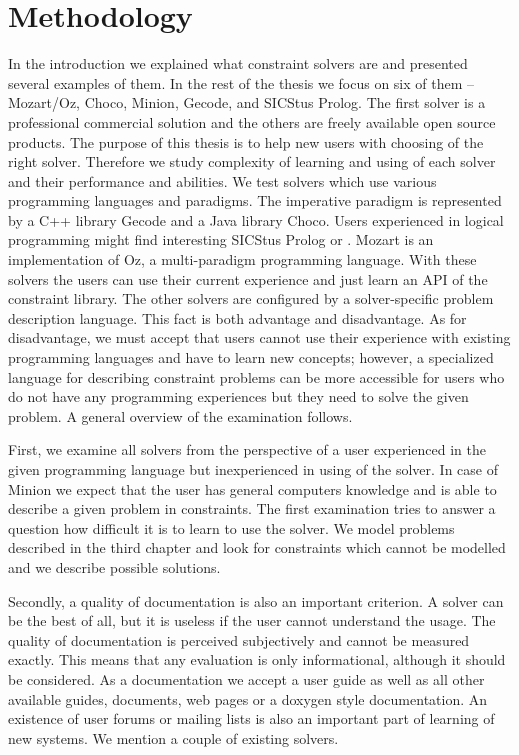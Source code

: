 \chapter{Methodology}
\thispagestyle{myheadings}

In the introduction we explained what constraint solvers are and presented several 
examples of them. In the rest of the thesis we focus on six of them -- Mozart/Oz, 
Choco, Minion, Gecode, \eclipse and SICStus Prolog. The first solver is a 
professional commercial solution and the others are freely available open source 
products. The purpose of this thesis is to help new users with choosing of the right solver. 
Therefore we study complexity of learning and using of each solver and their 
performance and abilities. We test solvers which use various programming languages 
and paradigms. The imperative paradigm is represented by a C++ library Gecode and a Java 
library Choco. Users experienced in logical programming might find interesting 
SICStus Prolog or \eclipse. Mozart is an implementation of Oz, a multi-paradigm 
programming language. With these solvers the users can use their current experience and 
just learn an API of the constraint library. The other solvers are configured by 
a solver-specific problem description language. This fact is both advantage and disadvantage. 
As for disadvantage, we must accept that users cannot use their experience with 
existing programming languages and have to learn new concepts; however, a specialized 
language for describing constraint problems can be more accessible for users who 
do not have any programming experiences but they need to solve the given problem.
A general overview of the examination follows.

First, we examine all solvers from the perspective of a user experienced in the given 
programming language but inexperienced in using of the solver. In case of Minion 
we expect that the user has general computers knowledge and is able 
to describe a given problem in constraints. The first examination tries to answer 
a question how difficult it is to learn to use the solver. We model problems 
described in the third chapter and look for constraints which cannot be modelled 
and we describe possible solutions. 

Secondly, a quality of documentation is also an important criterion. A solver can be 
the best of all, but it is useless if the user cannot understand the usage. 
The quality of documentation is perceived subjectively and cannot be measured 
exactly. This means that any evaluation is only informational, although it should be 
considered. As a documentation we accept a user guide as well as all other available 
guides, documents, web pages or a doxygen style documentation. An existence of user 
forums or mailing lists is also an important part of learning of new systems. We 
mention a couple of existing solvers. 


